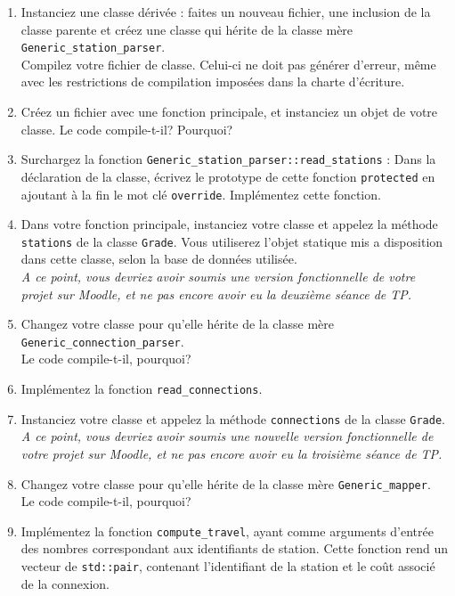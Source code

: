 \documentclass[9pts]{article}
\begin{document}
\begin{enumerate}
\item Instanciez une classe dérivée : faites un nouveau fichier, une inclusion de la classe parente et créez une classe qui hérite de la classe mère \texttt{Generic\_station\_parser}.\\
Compilez votre fichier de classe. Celui-ci ne doit pas générer d'erreur, même avec les restrictions de compilation imposées dans la charte d'écriture.

\item Créez un fichier avec une fonction principale, et instanciez un objet de votre classe. Le code compile-t-il? Pourquoi?

\item Surchargez la fonction \texttt{Generic\_station\_parser::read\_stations} : Dans la déclaration de la classe, écrivez le prototype de cette fonction \texttt{protected} en ajoutant à la fin le mot clé \texttt{override}. Implémentez cette fonction.

\item Dans votre fonction principale, instanciez votre classe et appelez la méthode \texttt{stations} de la classe \texttt{Grade}. Vous utiliserez l'objet statique mis a disposition dans cette classe, selon la base de données utilisée.\\

\emph{A ce point, vous devriez avoir soumis une version fonctionnelle de votre projet sur Moodle, et ne pas encore avoir eu la deuxième séance de TP.}\\

\item Changez votre classe pour qu'elle hérite de la classe mère \texttt{Generic\_connection\_parser}.\\
Le code compile-t-il, pourquoi?
\item Implémentez la fonction \texttt{read\_connections}.
\item Instanciez votre classe et appelez la méthode \texttt{connections} de la classe \texttt{Grade}.\\

\emph{A ce point, vous devriez avoir soumis une nouvelle version fonctionnelle de votre projet sur Moodle, et ne pas encore avoir eu la troisième séance de TP.}\\

\item Changez votre classe pour qu'elle hérite de la classe mère \texttt{Generic\_mapper}.\\
Le code compile-t-il, pourquoi?
\item Implémentez la fonction \texttt{compute\_travel}, ayant comme arguments d'entrée des nombres correspondant aux identifiants de station. Cette fonction rend un vecteur de \texttt{std::pair}, contenant l'identifiant de la station et le coût associé de la connexion.


\end{enumerate}
\end{document}
